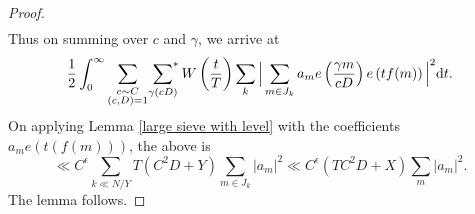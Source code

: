 \documentclass[12pt,a4paper,twoside, reqno]{amsart}
\newcommand{\sumstar}{\sideset{}{^*}\sum}
\begin{document}
\begin{proof}
\begin{align*}
\end{align*}
Thus on summing over $c$ and $\gamma$, we arrive at 
\begin{align*}
     \frac{1}{2} \int_{0}^{\infty} \mathop{\sum_{\substack{c \sim C \\ (c,D)=1}}}\sumstar_{\gamma (cD)} W\left( \frac{t}{T} \right) \sum_k \Big|\sum_{m \in J_k} a_m e\left(\frac{\gamma m}{cD}\right) e\left( tf(m) \right) \Big|^2\mathrm{d}t.
\end{align*}
On applying Lemma \ref{large sieve with level} with the coefficients $a_m e(t(f(m)))$, the above is  
\[ \ll C^\epsilon \sum_{k \ll N/Y} T (C^2D+ Y)\sum_{m \in J_k}|a_m|^2 \ll C^\epsilon (TC^2D + X )\sum_m|a_m|^2.\]
The lemma follows.

\end{proof}
\end{document}
